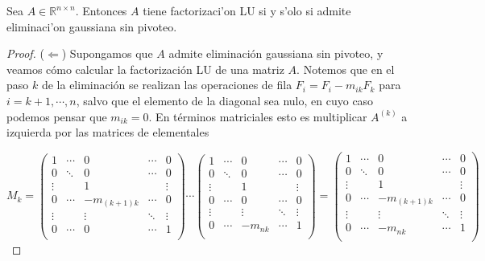 \begin{propo}
	Sea $A \in \mathbb{R}^{n \times n}$. Entonces $A$ tiene factorizaci'on LU si y s'olo si admite eliminaci'on gaussiana sin pivoteo.
	
	\begin{proof}
	
($\Leftarrow$) Supongamos que $A$ admite eliminación gaussiana sin pivoteo, y veamos cómo calcular la factorización LU de una matriz $A$. Notemos que en el paso $k$ de la eliminación se realizan las operaciones de fila $F_i = F_i - m_{ik} F_k$ para $i = k + 1, \cdots, n$, salvo que el elemento de la diagonal sea nulo, en cuyo caso podemos pensar que $m_{ik} = 0$. En términos matriciales esto es multiplicar $A^{(k)}$ a izquierda por las matrices de elementales

\[
M_k = 
\begin{pmatrix} 
1 		& \cdots 	& 0 				& \cdots 	& 0 \\
0 		& \ddots 	& 0 				& \cdots 	& 0 \\
\vdots 	& 			& 1 				& 			& \vdots\\
0		& \cdots		& -m_{(k+1)k} 	& \cdots		& 0\\
\vdots	& 			& \vdots		 	& \ddots		& \vdots\\
0		& \cdots		& 0				& \cdots		& 1\\
\end{pmatrix}
\cdots
\begin{pmatrix} 
1 		& \cdots 	& 0 				& \cdots 	& 0 \\
0 		& \ddots 	& 0 				& \cdots 	& 0 \\
\vdots 	& 			& 1 				& 			& \vdots\\
0		& \cdots		& 0 	& \cdots		& 0\\
\vdots	& 			& \vdots		 	& \ddots		& \vdots\\
0		& \cdots		& -m_{nk}	& \cdots		& 1\\
\end{pmatrix}
=
\begin{pmatrix} 
1 		& \cdots 	& 0 				& \cdots 	& 0 \\
0 		& \ddots 	& 0 				& \cdots 	& 0 \\
\vdots 	& 			& 1 				& 			& \vdots\\
0		& \cdots		& -m_{(k+1)k} 	& \cdots		& 0\\
\vdots	& 			& \vdots		 	& \ddots		& \vdots\\
0		& \cdots		& -m_{nk}	& \cdots		& 1\\
\end{pmatrix}
\]


\end{proof}
\end{propo}
